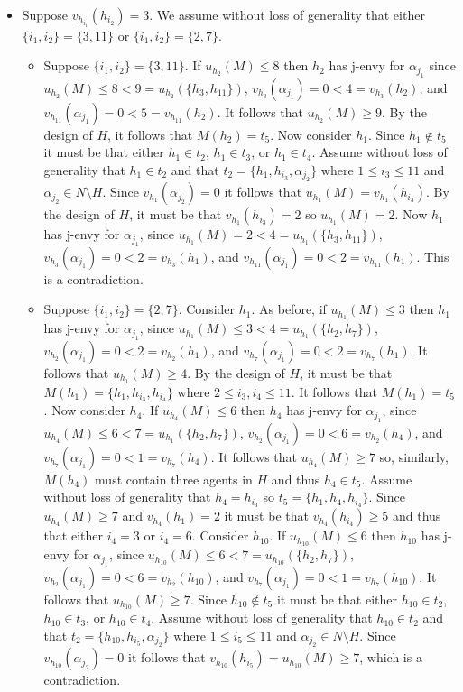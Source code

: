 \begin{itemize}
    \item Suppose $v_{h_{i_1}}(h_{i_2}) = 3$. We assume without loss of generality that either $\{ i_1, i_2 \} = \{ 3, 11 \}$ or $\{ i_1, i_2 \} = \{ 2, 7 \}$.
\begin{itemize}
    \item Suppose $\{ i_1, i_2 \} = \{ 3, 11 \}$. If $u_{h_2}(M) \leq 8$ then $h_2$ has j-envy for $\alpha_{j_1}$ since $u_{h_2}(M) \leq 8 < 9 = u_{h_2}(\{ h_3, h_{11} \})$, $v_{h_3}(\alpha_{j_1}) = 0 < 4 = v_{h_3}(h_2)$, and $v_{h_{11}}(\alpha_{j_1}) = 0 < 5 = v_{h_{11}}(h_2)$. It follows that $u_{h_2}(M) \geq 9$. By the design of $H$, it follows that $M(h_2) = t_5$. Now consider $h_1$. Since $h_1 \notin t_5$ it must be that either $h_1 \in t_2$, $h_1 \in t_3$, or $h_1 \in t_4$. Assume without loss of generality that $h_1 \in t_2$ and that $t_2 = \{ h_1, h_{i_3}, \alpha_{j_2} \}$ where $1\leq i_3 \leq 11$ and $\alpha_{j_2} \in N \setminus H$. Since $v_{h_1}(\alpha_{j_2})=0$ it follows that $u_{h_1}(M) = v_{h_1}(h_{i_3})$. By the design of $H$, it must be that $v_{h_1}(h_{i_3}) = 2$ so $u_{h_1}(M) = 2$. Now $h_1$ has j-envy for $\alpha_{j_1}$, since $u_{h_1}(M) = 2 < 4 = u_{h_1}(\{ h_3, h_{11} \})$, $v_{h_3}(\alpha_{j_1}) = 0 < 2 = v_{h_3}(h_1)$, and $v_{h_{11}}(\alpha_{j_1}) = 0 < 2 = v_{h_{11}}(h_1)$. This is a contradiction. 
    \item Suppose $\{ i_1, i_2 \} = \{ 2, 7 \}$. Consider $h_1$. As before, if $u_{h_1}(M) \leq 3$ then $h_1$ has j-envy for $\alpha_{j_1}$, since $u_{h_1}(M) \leq 3 < 4 = u_{h_1}(\{ h_2, h_7 \})$, $v_{h_2}(\alpha_{j_1}) = 0 < 2 = v_{h_2}(h_1)$, and $v_{h_7}(\alpha_{j_1}) = 0 < 2 = v_{h_7}(h_1)$. It follows that $u_{h_1}(M) \geq 4$. By the design of $H$, it must be that $M(h_1) = \{ h_1, h_{i_3}, h_{i_4} \}$ where $2\leq i_3, i_4 \leq 11$. It follows that $M(h_1) = t_5$. Now consider $h_4$. If $u_{h_4}(M) \leq 6$ then $h_4$ has j-envy for $\alpha_{j_1}$, since $u_{h_4}(M) \leq 6 < 7 = u_{h_1}(\{ h_2, h_7 \})$, $v_{h_2}(\alpha_{j_1}) = 0 < 6 = v_{h_2}(h_4)$, and $v_{h_7}(\alpha_{j_1}) = 0 < 1 = v_{h_7}(h_4)$. It follows that $u_{h_4}(M) \geq 7$ so, similarly, $M(h_4)$ must contain three agents in $H$ and thus $h_4 \in t_5$. Assume without loss of generality that $h_4 = h_{i_3}$ so $t_5 = \{ h_1, h_4, h_{i_4} \}$. Since $u_{h_4}(M) \geq 7$ and $v_{h_4}(h_1)=2$ it must be that $v_{h_4}(h_{i_4}) \geq 5$ and thus that either $i_4 = 3$ or $i_4 = 6$. Consider $h_{10}$. If $u_{h_{10}}(M) \leq 6$ then $h_{10}$ has j-envy for $\alpha_{j_1}$, since $u_{h_{10}}(M) \leq 6 < 7 = u_{h_{10}}(\{ h_2, h_7 \})$, $v_{h_2}(\alpha_{j_1}) = 0 < 6 = v_{h_2}(h_{10})$, and $v_{h_7}(\alpha_{j_1}) = 0 < 1 = v_{h_7}(h_{10})$. It follows that $u_{h_{10}}(M) \geq 7$. Since $h_{10} \notin t_5$ it must be that either $h_{10} \in t_2$, $h_{10} \in t_3$, or $h_{10} \in t_4$. Assume without loss of generality that $h_{10} \in t_2$ and that $t_2 = \{ h_{10}, h_{i_5}, \alpha_{j_2} \}$ where $1\leq i_5 \leq 11$ and $\alpha_{j_2} \in N \setminus H$. Since $v_{h_{10}}(\alpha_{j_2})=0$ it follows that $v_{h_{10}}(h_{i_5}) = u_{h_{10}}(M) \geq 7$, which is a contradiction.

\end{itemize}
\end{itemize}
